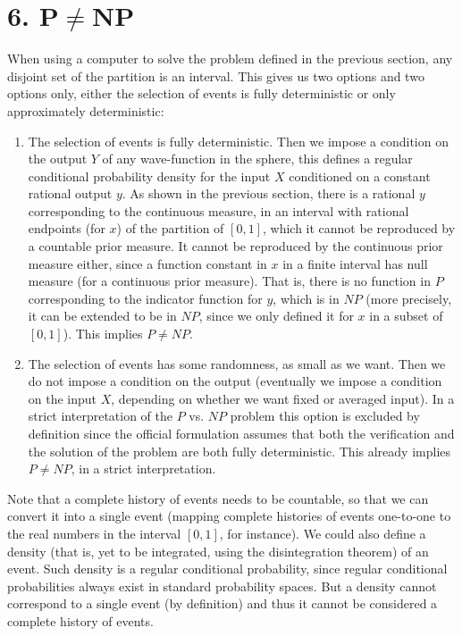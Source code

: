 \documentclass[11pt]{book}
\begin{document}
\hypertarget{pneqnp}{%
\section{\texorpdfstring{6.
P\(\neq\)NP}{6. P\textbackslash neqNP}}\label{pneqnp}}

When using a computer to solve the problem defined in the previous
section, any disjoint set of the partition is an interval. This gives us
two options and two options only, either the selection of events is
fully deterministic or only approximately deterministic:

\begin{enumerate}
\item
  The selection of events is fully deterministic. Then we impose a
  condition on the output \(Y\) of any wave-function in the sphere, this
  defines a regular conditional probability density for the input \(X\)
  conditioned on a constant rational output \(y\). As shown in the
  previous section, there is a rational \(y\) corresponding to the
  continuous measure, in an interval with rational endpoints (for \(x\))
  of the partition of \([0,1]\), which it cannot be reproduced by a
  countable prior measure. It cannot be reproduced by the continuous
  prior measure either, since a function constant in \(x\) in a finite
  interval has null measure (for a continuous prior measure). That is,
  there is no function in \(P\) corresponding to the indicator function
  for \(y\), which is in \(NP\) (more precisely, it can be extended to
  be in \(NP\), since we only defined it for \(x\) in a subset of
  \([0,1]\)). This implies \(P\neq NP\).
\item
  The selection of events has some randomness, as small as we want. Then
  we do not impose a condition on the output (eventually we impose a
  condition on the input \(X\), depending on whether we want fixed or
  averaged input). In a strict interpretation of the \(P\) vs. \(NP\)
  problem this option is excluded by definition since the official
  formulation assumes that both the verification and the solution of the
  problem are both fully deterministic. This already implies
  \(P\neq NP\), in a strict interpretation.
\end{enumerate}

Note that a complete history of events needs to be countable, so that we
can convert it into a single event (mapping complete histories of events
one-to-one to the real numbers in the interval \([0,1]\), for instance).
We could also define a density (that is, yet to be integrated, using the
disintegration
theorem\cite{chang1997conditioning}) of an event. Such density is a regular conditional probability,
since regular conditional probabilities always exist in standard
probability
spaces\cite{durrett2019probability}.
But a density cannot correspond to a single event (by definition) and
thus it cannot be considered a complete history of events.
\end{document}
